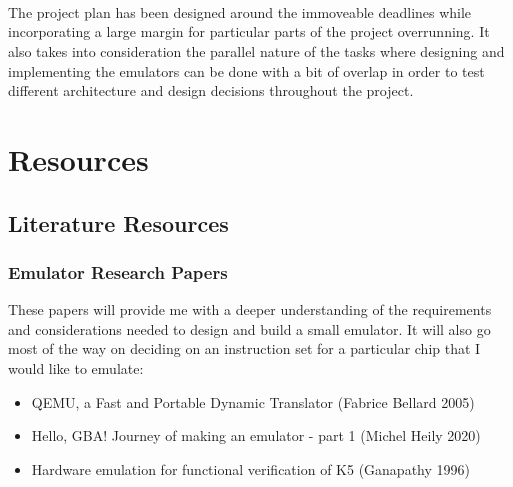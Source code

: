 \documentclass{article}
\begin{document}
\begin{center}
\begin{ganttchart}{1}{23}
   \\
   \\
 \\
 \ganttnewline
{} \ganttnewline
{} \ganttnewline
{} \ganttnewline
{} \ganttnewline
{} \ganttnewline
{} \ganttnewline
{}
\end{ganttchart}
\end{center}

The project plan has been designed around the immoveable deadlines while incorporating a large margin for particular 
parts of the project overrunning. It also takes into consideration the parallel nature of the tasks where designing 
and implementing the emulators can be done with a bit of overlap in order to test different architecture and design 
decisions throughout the project.

\section{Resources}

\subsection{Literature Resources}

\subsubsection{Emulator Research Papers}

These papers will provide me with a deeper understanding of the requirements and considerations needed to 
design and build a small emulator. It will also go most of the way on deciding on an instruction set for a 
particular chip that I would like to emulate:

\begin{itemize}
  \item QEMU, a Fast and Portable Dynamic Translator (Fabrice Bellard 2005)
  \item Hello, GBA! Journey of making an emulator - part 1 (Michel Heily 2020)
  \item Hardware emulation for functional verification of K5 (Ganapathy 1996)
\end{itemize}
\end{document}
